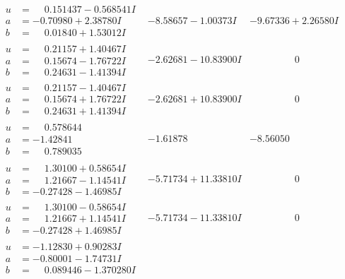 \documentclass[1p]{elsarticle_modified}
\theoremstyle{definition}
\begin{document}
$$\begin{array}{c|c|c}
\begin{aligned}
u &= \phantom{-}0.151437 - 0.568541 I \\
a &= -0.70980 + 2.38780 I \\
b &= \phantom{-}0.01840 + 1.53012 I\end{aligned}
 & -8.58657 - 1.00373 I & -9.67336 + 2.26580 I \\ \hline\begin{aligned}
u &= \phantom{-}0.21157 + 1.40467 I \\
a &= \phantom{-}0.15674 - 1.76722 I \\
b &= \phantom{-}0.24631 - 1.41394 I\end{aligned}
 & -2.62681 - 10.83900 I & \phantom{-0.000000 } 0 \\ \hline\begin{aligned}
u &= \phantom{-}0.21157 - 1.40467 I \\
a &= \phantom{-}0.15674 + 1.76722 I \\
b &= \phantom{-}0.24631 + 1.41394 I\end{aligned}
 & -2.62681 + 10.83900 I & \phantom{-0.000000 } 0 \\ \hline\begin{aligned}
u &= \phantom{-}0.578644\phantom{ +0.000000I} \\
a &= -1.42841\phantom{ +0.000000I} \\
b &= \phantom{-}0.789035\phantom{ +0.000000I}\end{aligned}
 & -1.61878\phantom{ +0.000000I} & -8.56050\phantom{ +0.000000I} \\ \hline\begin{aligned}
u &= \phantom{-}1.30100 + 0.58654 I \\
a &= \phantom{-}1.21667 - 1.14541 I \\
b &= -0.27428 - 1.46985 I\end{aligned}
 & -5.71734 + 11.33810 I & \phantom{-0.000000 } 0 \\ \hline\begin{aligned}
u &= \phantom{-}1.30100 - 0.58654 I \\
a &= \phantom{-}1.21667 + 1.14541 I \\
b &= -0.27428 + 1.46985 I\end{aligned}
 & -5.71734 - 11.33810 I & \phantom{-0.000000 } 0 \\ \hline\begin{aligned}
u &= -1.12830 + 0.90283 I \\
a &= -0.80001 - 1.74731 I \\
b &= \phantom{-}0.089446 - 1.370280 I\end{aligned}

\end{array}$$
\end{document}
